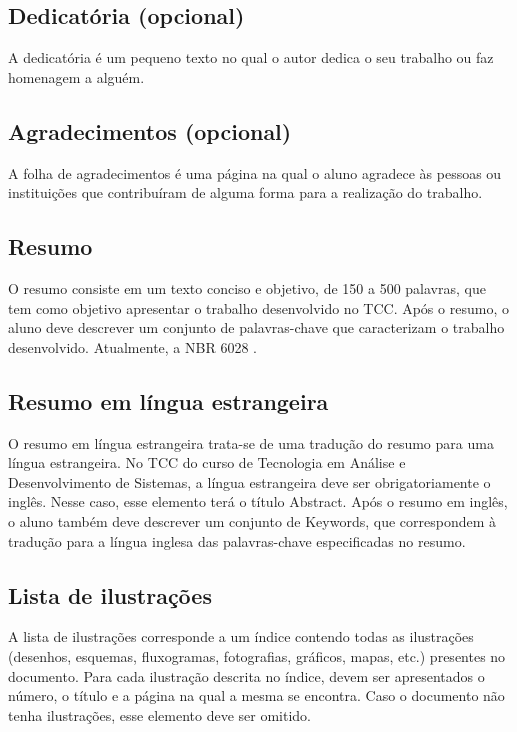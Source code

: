 \subsection{Dedicatória (opcional)}

A dedicatória é um pequeno texto no qual o autor dedica o seu trabalho ou faz homenagem a alguém.

\subsection{Agradecimentos (opcional)}

A folha de agradecimentos é uma página na qual o aluno agradece às pessoas ou instituições que contribuíram de alguma forma para a realização do trabalho. 

\subsection{Resumo}

O resumo consiste em um texto conciso e objetivo, de 150 a 500 palavras, que tem como objetivo apresentar o trabalho desenvolvido no TCC. Após o resumo, o aluno deve descrever um conjunto de palavras-chave que caracterizam o trabalho desenvolvido. Atualmente, a NBR 6028 \cite{NBR6028:2003}.

\subsection{Resumo em língua estrangeira}

O resumo em língua estrangeira trata-se de uma tradução do resumo para uma língua estrangeira. No TCC do curso de Tecnologia em Análise e Desenvolvimento de Sistemas, a língua estrangeira deve ser obrigatoriamente o inglês. Nesse caso, esse elemento terá o título Abstract. Após o resumo em inglês, o aluno também deve descrever um conjunto de Keywords, que correspondem à tradução para a língua inglesa das palavras-chave especificadas no resumo.

\subsection{Lista de ilustrações}

A lista de ilustrações corresponde a um índice contendo todas as ilustrações (desenhos, esquemas, fluxogramas, fotografias, gráficos, mapas, etc.) presentes no documento. Para cada ilustração descrita no índice, devem ser apresentados o número, o título e a página na qual a mesma se encontra. Caso o documento não tenha ilustrações, esse elemento deve ser omitido.

